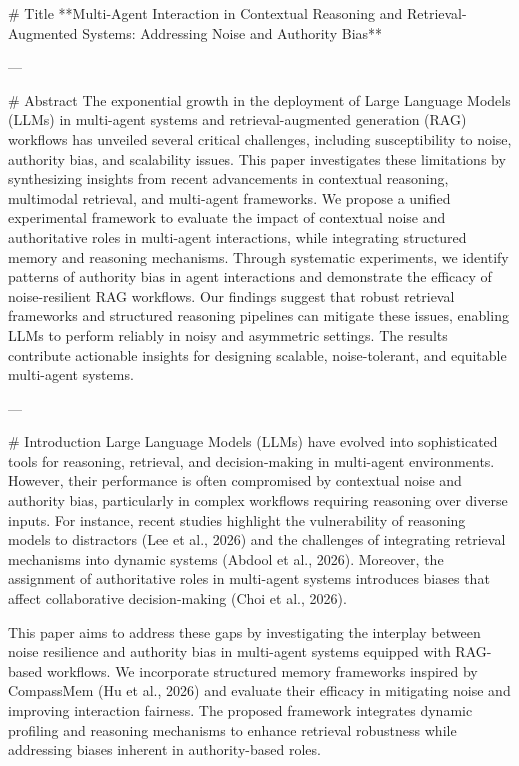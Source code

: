# Title  
**Multi-Agent Interaction in Contextual Reasoning and Retrieval-Augmented Systems: Addressing Noise and Authority Bias**

---

# Abstract  
The exponential growth in the deployment of Large Language Models (LLMs) in multi-agent systems and retrieval-augmented generation (RAG) workflows has unveiled several critical challenges, including susceptibility to noise, authority bias, and scalability issues. This paper investigates these limitations by synthesizing insights from recent advancements in contextual reasoning, multimodal retrieval, and multi-agent frameworks. We propose a unified experimental framework to evaluate the impact of contextual noise and authoritative roles in multi-agent interactions, while integrating structured memory and reasoning mechanisms. Through systematic experiments, we identify patterns of authority bias in agent interactions and demonstrate the efficacy of noise-resilient RAG workflows. Our findings suggest that robust retrieval frameworks and structured reasoning pipelines can mitigate these issues, enabling LLMs to perform reliably in noisy and asymmetric settings. The results contribute actionable insights for designing scalable, noise-tolerant, and equitable multi-agent systems.

---

# Introduction  
Large Language Models (LLMs) have evolved into sophisticated tools for reasoning, retrieval, and decision-making in multi-agent environments. However, their performance is often compromised by contextual noise and authority bias, particularly in complex workflows requiring reasoning over diverse inputs. For instance, recent studies highlight the vulnerability of reasoning models to distractors (Lee et al., 2026) and the challenges of integrating retrieval mechanisms into dynamic systems (Abdool et al., 2026). Moreover, the assignment of authoritative roles in multi-agent systems introduces biases that affect collaborative decision-making (Choi et al., 2026).

This paper aims to address these gaps by investigating the interplay between noise resilience and authority bias in multi-agent systems equipped with RAG-based workflows. We incorporate structured memory frameworks inspired by CompassMem (Hu et al., 2026) and evaluate their efficacy in mitigating noise and improving interaction fairness. The proposed framework integrates dynamic profiling and reasoning mechanisms to enhance retrieval robustness while addressing biases inherent in authority-based roles.

